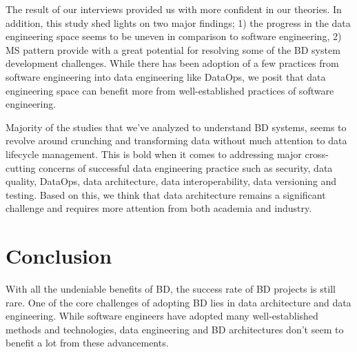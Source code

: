 \documentclass[a4paper,11pt,article,oneside]{memoir}
\begin{document}

The result of our interviews provided us with more confident in our theories. In addition, this study shed lights on two major findings; 1) the progress in the data engineering space seems to be uneven in comparison to software engineering, 2) MS pattern provide with a great potential for resolving some of the BD system development challenges. While there has been adoption of a few practices from software engineering into data engineering like DataOps, we posit that data engineering space can benefit more from well-established practices of software engineering. 

Majority of the studies that we've analyzed to understand BD systems, seems to revolve around crunching and transforming data without much attention to data lifecycle management. This is bold when it comes to addressing major cross-cutting concerns of successful data engineering practice such as security, data quality, DataOps, data architecture, data interoperability, data versioning and testing. Based on this, we think that data architecture remains a significant challenge and requires more attention from both academia and industry. 





\chapter{Conclusion}

With all the undeniable benefits of BD, the success rate of BD projects is still rare. One of the core challenges of adopting BD lies in data architecture and data engineering. While software engineers have adopted many well-established methods and technologies, data engineering and BD architectures don't seem to benefit a lot from these advancements. 
\end{document}
